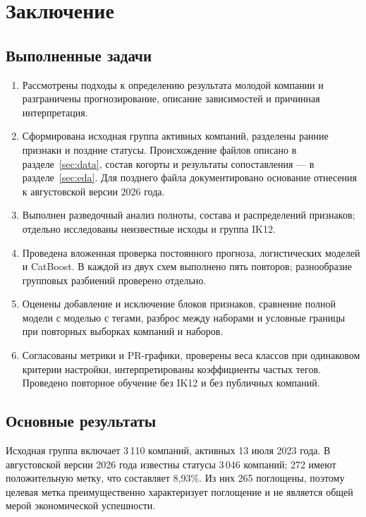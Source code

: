 \clearpage
\section{Заключение}
\label{sec:conclusion}

\subsection{Выполненные задачи}

\begin{enumerate}
\item Рассмотрены подходы к определению результата молодой компании и разграничены прогнозирование, описание зависимостей и причинная интерпретация.
\item Сформирована исходная группа активных компаний, разделены ранние признаки и поздние статусы. Происхождение файлов описано в разделе~\ref{sec:data}, состав когорты и результаты сопоставления --- в разделе~\ref{sec:eda}. Для позднего файла документировано основание отнесения к августовской версии 2026 года.
\item Выполнен разведочный анализ полноты, состава и распределений признаков; отдельно исследованы неизвестные исходы и группа IK12.
\item Проведена вложенная проверка постоянного прогноза, логистических моделей и CatBoost. В каждой из двух схем выполнено пять повторов; разнообразие групповых разбиений проверено отдельно.
\item Оценены добавление и исключение блоков признаков, сравнение полной модели с моделью с тегами, разброс между наборами и условные границы при повторных выборках компаний и наборов.
\item Согласованы метрики и PR-графики, проверены веса классов при одинаковом критерии настройки, интерпретированы коэффициенты частых тегов. Проведено повторное обучение без IK12 и без публичных компаний.
\end{enumerate}

\subsection{Основные результаты}

Исходная группа включает 3\,110 компаний, активных 13 июля 2023 года. В августовской версии 2026 года известны статусы 3\,046 компаний; 272 имеют положительную метку, что составляет 8,93\%. Из них 265 поглощены, поэтому целевая метка преимущественно характеризует поглощение и не является общей мерой экономической успешности.

